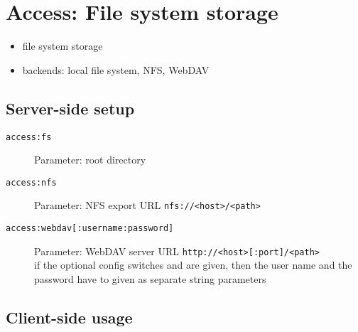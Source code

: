 \section{Access: File system storage}
\label{sect:dataprov_access}

\begin{itemize}
  \item file system storage
  \item backends: local file system, NFS, WebDAV
\end{itemize}


\subsection{Server-side setup}

\begin{description}
  \item[\texttt{access:fs}] Parameter: root directory
  \item[\texttt{access:nfs}] Parameter: NFS export URL \texttt{nfs://<host>/<path>}
  \item[\texttt{access:webdav[:username:password]}] Parameter: WebDAV server URL \texttt{http://<host>[:port]/<path>}\\
if the optional config switches  and  are given, then the user name and the password have to given as separate string parameters
\end{description}


\subsection{Client-side usage}

